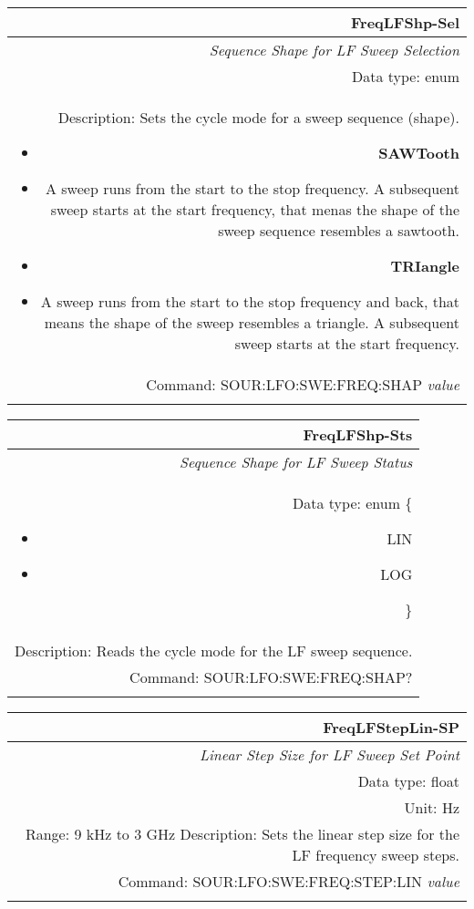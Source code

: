 \documentclass[openany]{article}
\begin{document}
		\begin{tabular}{N}
			\hline
			\bfseries FreqLFShp-Sel \\ \hline
			\emph{Sequence Shape for LF Sweep Selection} \\
			Data type: enum \\ 
			Description: Sets the cycle mode for a sweep sequence (shape).\begin{itemize}[noitemsep]
				\small
				\item[] \textbf{SAWTooth} 
				\item[]	A sweep runs from the start to the stop frequency. A subsequent sweep starts at the start frequency, that menas the shape of the sweep sequence resembles a sawtooth.
				\item[] \textbf{TRIangle}
				\item[] A sweep runs from the start to the stop frequency and back, that means the shape of the sweep resembles a triangle. A subsequent sweep starts at the start frequency.
			\end{itemize} \\
			Command: SOUR:LFO:SWE:FREQ:SHAP \emph{value} \\
			\\

		\end{tabular}


		\begin{tabular}{N}
			\hline
			\bfseries FreqLFShp-Sts \\ \hline
			\emph{Sequence Shape for LF Sweep Status} \\
			Data type: enum \{\begin{itemize}[noitemsep]
				\small
				\item[] LIN
				\item[] LOG
			\end{itemize}\} \\ 
			Description: Reads the cycle mode for the LF sweep sequence. \\
			Command: SOUR:LFO:SWE:FREQ:SHAP? \\
			\\

		\end{tabular}


		\begin{tabular}{N}
			\hline
			\bfseries FreqLFStepLin-SP \\ \hline
			\emph{Linear Step Size for LF Sweep Set Point} \\
			Data type: float \\
			Unit: Hz \\ 
			Range: 9 kHz to 3 GHz
			Description: Sets the linear step size for the LF frequency sweep steps.\\
			Command: SOUR:LFO:SWE:FREQ:STEP:LIN \emph{value} \\
			\\
			
		\end{tabular}
\end{document}
